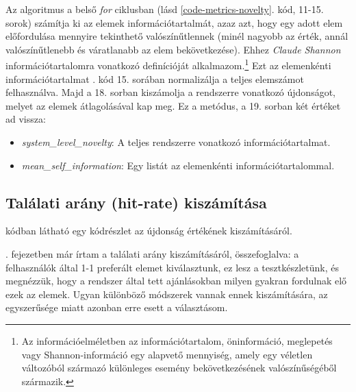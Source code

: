 \documentclass[
]{thesis-ekf}
\theoremstyle{definition}
\theoremstyle{remark}
\begin{document}
Az algoritmus a belső \emph{for} ciklusban (lásd \ref{code-metrics-novelty}. kód, 11-15. sorok) számítja ki az elemek információtartalmát, azaz azt, hogy egy adott elem előfordulása mennyire tekinthető valószínűtlennek (minél nagyobb az érték, annál valószínűtlenebb és váratlanabb az elem bekövetkezése). Ehhez \emph{Claude Shannon} információtartalomra vonatkozó definícióját alkalmazom.\cite{wiki-self-information}\footnote{Az információelméletben az információtartalom, öninformáció, meglepetés vagy Shannon-információ egy alapvető mennyiség, amely egy véletlen változóból származó különleges esemény bekövetkezésének valószínűségéből származik.} Ezt az elemenkénti információtartalmat . kód 15. sorában normalizálja a teljes elemszámot felhasználva. Majd a 18. sorban kiszámolja a rendszerre vonatkozó újdonságot, melyet az elemek átlagolásával kap meg. Ez a metódus, a 19. sorban két értéket ad vissza:
\begin{itemize}
	\item \emph{system\_level\_novelty}: A teljes rendszerre vonatkozó információtartalmat.
	\item \emph{mean\_self\_information}: Egy listát az elemenkénti információtartalommal.
\end{itemize}

\subsection{Találati arány (hit-rate) kiszámítása}
 kódban látható egy kódrészlet az újdonság értékének kiszámításáról.



. fejezetben már írtam a találati arány kiszámításáról, összefoglalva: a felhasználók által 1-1 preferált elemet kiválasztunk, ez lesz a tesztkészletünk, és megnézzük, hogy a rendszer által tett ajánlásokban milyen gyakran fordulnak elő ezek az elemek. Ugyan különböző módszerek vannak ennek kiszámítására, az egyszerűsége miatt azonban erre esett a választásom.
\end{document}
